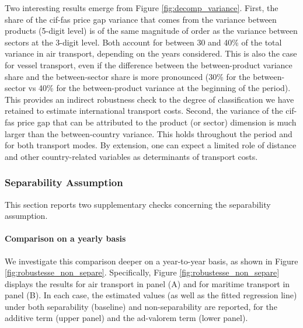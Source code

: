 \documentclass[11pt,twoside, authoryear]{elsarticle}
\begin{document}
Two interesting results emerge from Figure \ref{fig:decomp_variance}.
First, the share of the cif-fas price gap variance that comes from the variance between products (5-digit level) is of the same magnitude of order as the variance between sectors at the 3-digit level.
Both account for between 30 and 40\% of the total variance in air transport, depending on the years considered.
This is also the case for vessel transport, even if the difference between the between-product variance share and the between-sector share is more pronounced (30\% for the between-sector vs 40\% for the between-product variance at the beginning of the period).
This provides an indirect robustness check to the degree of classification we have retained to estimate international transport costs.
Second, the variance of the cif-fas price gap that can be attributed to the product (or sector) dimension is much larger than the between-country variance.
This holds throughout the period and for both transport modes. By extension, one can expect a limited role of distance and other country-related variables as determinants of transport costs.


\setcounter{table}{0}
\renewcommand{\thetable}{C.\arabic{table}}

\setcounter{figure}{0}
\renewcommand{\thefigure}{C.\arabic{figure}}



\subsubsection{Separability Assumption}


This section reports two supplementary checks concerning the separability assumption.

\paragraph{Comparison on a yearly basis} We investigate this comparison deeper on a year-to-year basis, as shown in Figure \ref{fig:robustesse_non_separe}. Specifically, Figure \ref{fig:robustesse_non_separe} displays the results for air transport in panel (A) and for maritime transport in panel (B). In each case, the estimated values (as well as the fitted regression line) under both separability (baseline) and non-separability are reported, for the additive term (upper panel) and the ad-valorem term (lower panel).
\end{document}
